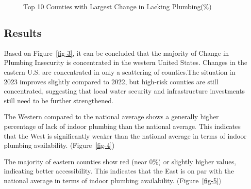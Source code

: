\documentclass[
  letterpaper,
  DIV=11,
  numbers=noendperiod]{scrartcl}
\begin{document}
\begin{figure}[H]


\caption{\label{fig-6}Top 10 Counties with Largest Change in Lacking
Plumbing(\%)}

\end{figure}%

\subsection{Results}\label{results}

Based on Figure~\ref{fig-3}, it can be concluded that the majority of
Change in Plumbing Insecurity is concentrated in the western United
States. Changes in the eastern U.S. are concentrated in only a
scattering of counties.The situation in 2023 improves slightly compared
to 2022, but high-risk counties are still concentrated, suggesting that
local water security and infrastructure investments still need to be
further strengthened.

The Western compared to the national average shows a generally higher
percentage of lack of indoor plumbing than the national average. This
indicates that the West is significantly weaker than the national
average in terms of indoor plumbing availability. (Figure~\ref{fig-4})

The majority of eastern counties show red (near 0\%) or slightly higher
values, indicating better accessibility. This indicates that the East is
on par with the national average in terms of indoor plumbing
availability. (Figure~\ref{fig-5})
\end{document}
